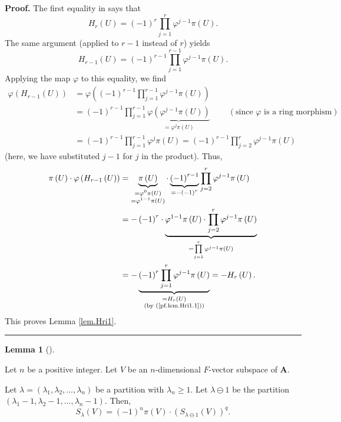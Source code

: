 \documentclass[numbers=enddot,12pt,final,onecolumn,notitlepage]{scrartcl}%
\numberwithin{exer}{section}
\theoremstyle{definition}
\newtheorem{lem}[theo]{Lemma}
\newenvironment{lemma}[1][]
{\begin{lem}[#1]\begin{leftbar}}
{\end{leftbar}\end{lem}}
\newenvironment{proof}[1][Proof]{\noindent\textbf{#1.} }{\ \rule{0.5em}{0.5em}}
\let\prodnonlimits\prod
\renewcommand{\prod}{\prodnonlimits\limits}
\theoremstyle{plainsl}
\begin{document}
\begin{proof}
The first equality in \cite[proof of (7.22)]{Macdon92} says that%
\begin{equation}
H_{r}\left(  U\right)  =\left(  -1\right)  ^{r}\prod_{j=1}^{r}\varphi^{j-1}%
\pi\left(  U\right)  . \label{pf.lem.Hri1.1}%
\end{equation}
The same argument (applied to $r-1$ instead of $r$) yields%
\[
H_{r-1}\left(  U\right)  =\left(  -1\right)  ^{r-1}\prod_{j=1}^{r-1}%
\varphi^{j-1}\pi\left(  U\right)  .
\]
Applying the map $\varphi$ to this equality, we find%
\begin{align*}
\varphi\left(  H_{r-1}\left(  U\right)  \right)   &  =\varphi\left(  \left(
-1\right)  ^{r-1}\prod_{j=1}^{r-1}\varphi^{j-1}\pi\left(  U\right)  \right) \\
&  =\left(  -1\right)  ^{r-1}\prod_{j=1}^{r-1}\underbrace{\varphi\left(
\varphi^{j-1}\pi\left(  U\right)  \right)  }_{=\varphi^{j}\pi\left(  U\right)
}\ \ \ \ \ \ \ \ \ \ \left(  \text{since }\varphi\text{ is a ring
morphism}\right) \\
&  =\left(  -1\right)  ^{r-1}\prod_{j=1}^{r-1}\varphi^{j}\pi\left(  U\right)
=\left(  -1\right)  ^{r-1}\prod_{j=2}^{r}\varphi^{j-1}\pi\left(  U\right)
\end{align*}
(here, we have substituted $j-1$ for $j$ in the product). Thus,%
\begin{align*}
\pi\left(  U\right)  \cdot\varphi\left(  H_{r-1}\left(  U\right)  \right)   &
=\underbrace{\pi\left(  U\right)  }_{\substack{=\varphi^{0}\pi\left(
U\right)  \\=\varphi^{1-1}\pi\left(  U\right)  }}\cdot\underbrace{\left(
-1\right)  ^{r-1}}_{=-\left(  -1\right)  ^{r}}\prod_{j=2}^{r}\varphi^{j-1}%
\pi\left(  U\right) \\
&  =-\left(  -1\right)  ^{r}\cdot\underbrace{\varphi^{1-1}\pi\left(  U\right)
\cdot\prod_{j=2}^{r}\varphi^{j-1}\pi\left(  U\right)  }_{=\prod_{j=1}%
^{r}\varphi^{j-1}\pi\left(  U\right)  }\\
&  =-\underbrace{\left(  -1\right)  ^{r}\prod_{j=1}^{r}\varphi^{j-1}\pi\left(
U\right)  }_{\substack{=H_{r}\left(  U\right)  \\\text{(by
(\ref{pf.lem.Hri1.1}))}}}=-H_{r}\left(  U\right)  .
\end{align*}
This proves Lemma \ref{lem.Hri1}.
\end{proof}

\begin{lemma}
\label{lem.fullhouse-1}Let $n$ be a positive integer. Let $V$ be an
$n$-dimensional $F$-vector subspace of $\mathbf{A}$.

Let $\lambda=\left(  \lambda_{1},\lambda_{2},\ldots,\lambda_{n}\right)  $ be a
partition with $\lambda_{n}\geq1$. Let $\lambda\ominus1$ be the partition
$\left(  \lambda_{1}-1,\lambda_{2}-1,\ldots,\lambda_{n}-1\right)  $. Then,%
\[
S_{\lambda}\left(  V\right)  =\left(  -1\right)  ^{n}\pi\left(  V\right)
\cdot\left(  S_{\lambda\ominus1}\left(  V\right)  \right)  ^{q}.
\]

\end{lemma}
\end{document}
